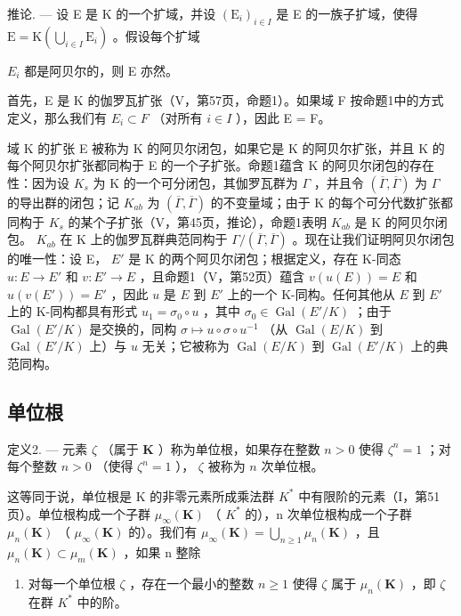 推论. --- 设 E 是 K 的一个扩域，并设 \((\mathrm{E}_{i})_{i\in I}\) 是 E 的一族子扩域，使得 \(\mathrm{E}=\mathrm{K}\left(\bigcup_{i\in I}\mathrm{E}_{i}\right)\) 。假设每个扩域

\(E_{i}\) 都是阿贝尔的，则 E 亦然。

首先，E 是 K 的伽罗瓦扩张（V，第57页，命题1）。如果域 F 按命题1中的方式定义，那么我们有 \(E_{i} \subset F\) （对所有 \(i \in I\) ），因此 E = F。

域 K 的扩张 E 被称为 K 的阿贝尔闭包，如果它是 K 的阿贝尔扩张，并且 K 的每个阿贝尔扩张都同构于 E 的一个子扩张。命题1蕴含 K 的阿贝尔闭包的存在性：因为设 \(K_{s}\) 为 K 的一个可分闭包，其伽罗瓦群为 \(\Gamma\) ，并且令 \((\overline{\Gamma},\overline{\Gamma})\) 为 \(\Gamma\) 的导出群的闭包；记 \(K_{ab}\) 为 \((\overline{\Gamma},\overline{\Gamma})\) 的不变量域；由于 K 的每个可分代数扩张都同构于 \(K_{s}\) 的某个子扩张（V，第45页，推论），命题1表明 \(K_{ab}\) 是 K 的阿贝尔闭包。 \(K_{ab}\) 在 K 上的伽罗瓦群典范同构于 \(\Gamma/(\overline{\Gamma},\overline{\Gamma})\) 。现在让我们证明阿贝尔闭包的唯一性：设 E， \(E'\) 是 K 的两个阿贝尔闭包；根据定义，存在 K-同态 \(u:E\to E'\) 和 \(v:E'\to E\) ，且命题1（V，第52页）蕴含 \(v(u(E)) = E\) 和 \(u(v(E')) = E'\) ，因此 \(u\) 是 \(E\) 到 \(E'\) 上的一个 K-同构。任何其他从 \(E\) 到 \(E'\) 上的 K-同构都具有形式 \(u_1 = \sigma_0 \circ u\) ，其中 \(\sigma_0 \in \operatorname{Gal}(E'/K)\) ；由于 \(\operatorname{Gal}(E'/K)\) 是交换的，同构 \(\sigma \mapsto u \circ \sigma \circ u^{-1}\) （从 \(\operatorname{Gal}(E/K)\) 到 \(\operatorname{Gal}(E'/K)\) 上）与 \(u\) 无关；它被称为 \(\operatorname{Gal}(E/K)\) 到 \(\operatorname{Gal}(E'/K)\) 上的典范同构。

\subsection{单位根}

定义2. --- 元素 \(\zeta\) （属于 \(\mathbf{K}\) ）称为单位根，如果存在整数 \(n > 0\) 使得 \(\zeta^n = 1\) ；对每个整数 \(n > 0\) （使得 \(\zeta^n = 1\) ）， \(\zeta\) 被称为 \(n\) 次单位根。

这等同于说，单位根是 K 的非零元素所成乘法群 \(K^{*}\) 中有限阶的元素（I，第51页）。单位根构成一个子群 \(\mu_{\infty}(\mathbf{K})\) （ \(K^{*}\) 的），n 次单位根构成一个子群 \(\mu_{n}(\mathbf{K})\) （ \(\mu_{\infty}(\mathbf{K})\) 的）。我们有 \(\mu_{\infty}(\mathbf{K}) = \bigcup_{n \geqslant 1} \mu_{n}(\mathbf{K})\) ，且 \(\mu_{n}(\mathbf{K}) \subset \mu_{m}(\mathbf{K})\) ，如果 n 整除

\begin{enumerate}
\def\labelenumi{\alph{enumi}.}
\setcounter{enumi}{12}
\tightlist
\item
  对每一个单位根 \(\zeta\) ，存在一个最小的整数 \(n \geqslant 1\) 使得 \(\zeta\) 属于 \(\mu_{n}(\mathbf{K})\) ，即 \(\zeta\) 在群 \(K^{*}\) 中的阶。
\end{enumerate}

